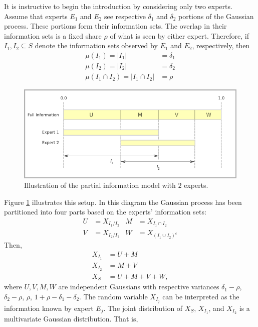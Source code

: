 \documentclass[11pt]{article}
\theoremstyle{definition}
\theoremstyle{definition}
\begin{document}
It is instructive to begin the introduction by considering only two experts. Assume that experts $E_1$ and $E_2$ see respective $\delta_1$ and $\delta_2$ portions of the Gaussian process. These portions form their information sets. The overlap in their information sets is a fixed share $\rho$ of what is seen by either expert. Therefore, if $I_1, I_2 \subseteq S$ denote the information sets observed by $E_1$ and $E_2$, respectively, then
\begin{align*}
\mu(I_1) = |I_1| &= \delta_1\\
\mu(I_2) = |I_2| &= \delta_2\\
\mu(I_1 \cap I_2) =  |I_1 \cap I_2| &= \rho
\end{align*}
\begin{figure}[htbp]
   \includegraphics[width = \textwidth]{N=2} %
   \caption{Illustration of the partial information model with $2$ experts.}
   \label{diagram2}
\end{figure}
Figure \ref{diagram2} illustrates this setup. In this diagram the Gaussian process has been partitioned into four parts based on the experts' information sets:
\begin{align*}
 U &= X_{I_1 / I_2}
& M &= X_{I_1 \cap I_2}\\
 V &= X_{I_2 / I_1}
& W &= X_{(I_1 \cup I_2)^c}
\end{align*}
Then,
\begin{align*}
X_{I_1} &= U + M\\
X_{I_2} &= M + V\\
X_S &= U+M+V+W,
\end{align*}
where $U, V, M, W$ are independent Gaussians with respective variances $\delta_1-\rho$, $\delta_2-\rho$, $\rho$, $1+\rho-\delta_1 - \delta_2$. The random variable $X_{I_j}$ can be interpreted as the information known by expert $E_j$. The joint distribution of $X_{S}$, $X_{I_1}$, and $X_{I_2}$ is a multivariate Gaussian distribution. That is,
\end{document}

